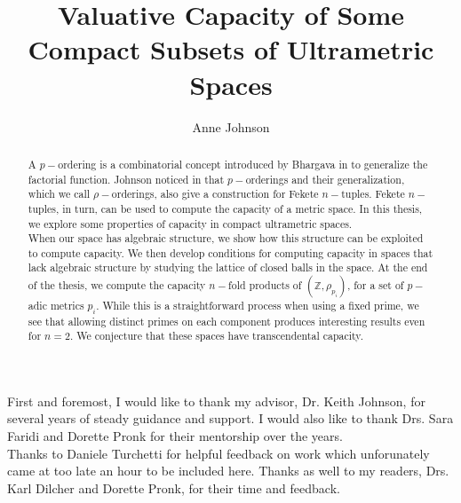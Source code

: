 \documentclass[12pt, glossary]{dalthesis}
\theoremstyle{plain}
\theoremstyle{definition}
\begin{document}
\title{Valuative Capacity of Some Compact Subsets of Ultrametric Spaces}
\author{Anne Johnson}

\mcs





\nolistoftables
\nolistoffigures

\frontmatter


\begin{abstract}
A $p-$ordering is a combinatorial concept introduced by Bhargava in \cite{mb1} to generalize the factorial function. Johnson noticed in \cite{kj} that $p-$orderings and their generalization, which we call $\rho-$orderings, also give a construction for Fekete $n-$tuples. Fekete $n-$tuples, in turn, can be used to compute the capacity of a metric space. In this thesis, we explore some properties of capacity in compact ultrametric spaces. \\

When our space has algebraic structure, we show how this structure can be exploited to compute capacity. We then develop conditions for computing capacity in spaces that lack algebraic structure by studying the lattice of closed balls in the space. At the end of the thesis, we compute the capacity $n-$fold products of $(\mathbb{Z}, \rho_{p_i})$, for a set of $p-$adic metrics $p_i$. While this is a  straightforward process when using a fixed prime, we see that allowing distinct primes on each component produces interesting results even for $n=2$. We conjecture that these spaces have transcendental capacity.  \\

\end{abstract}

\printglossary

\begin{acknowledgements}
  First and foremost, I would like to thank my advisor, Dr. Keith Johnson, for several years of steady guidance and support. I would also like to thank Drs. Sara Faridi and Dorette Pronk for their mentorship over the years.\\
  
 Thanks to Daniele Turchetti for helpful feedback on work which unforunately came at too late an hour to be included here. Thanks as well to my readers, Drs. Karl Dilcher and Dorette Pronk, for their time and feedback.\\
 

 
\end{acknowledgements}
\end{document}
